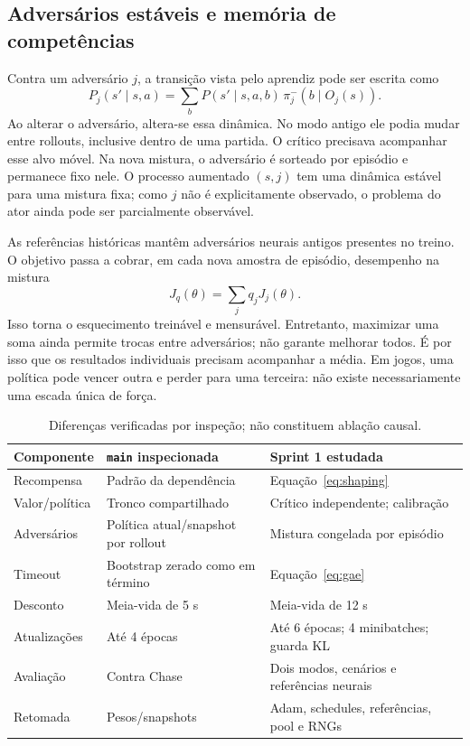 \documentclass[11pt,a4paper]{article}
\begin{document}
\subsection{Adversários estáveis e memória de competências}
Contra um adversário $j$, a transição vista pelo aprendiz pode ser escrita como
\begin{equation}
 P_j(s'\mid s,a)=\sum_b P(s'\mid s,a,b)\,\pi_j^-(b\mid O_j(s)).
\end{equation}
Ao alterar o adversário, altera-se essa dinâmica. No modo antigo ele podia mudar entre rollouts, inclusive dentro de uma partida. O crítico precisava acompanhar esse alvo móvel. Na nova mistura, o adversário é sorteado por episódio e permanece fixo nele. O processo aumentado $(s,j)$ tem uma dinâmica estável para uma mistura fixa; como $j$ não é explicitamente observado, o problema do ator ainda pode ser parcialmente observável.

As referências históricas mantêm adversários neurais antigos presentes no treino. O objetivo passa a cobrar, em cada nova amostra de episódio, desempenho na mistura
\begin{equation}
 J_q(\theta)=\sum_j q_jJ_j(\theta).
\end{equation}
Isso torna o esquecimento treinável e mensurável. Entretanto, maximizar uma soma ainda permite trocas entre adversários; não garante melhorar todos. É por isso que os resultados individuais precisam acompanhar a média. Em jogos, uma política pode vencer outra e perder para uma terceira: não existe necessariamente uma escada única de força.

\begin{table}[htbp]
\centering\small
\caption{Diferenças verificadas por inspeção; não constituem ablação causal.}
\begin{tabularx}{\textwidth}{@{}lYY@{}}\toprule
Componente & \texttt{main} inspecionada & Sprint 1 estudada\\\midrule
Recompensa & Padrão da dependência & Equação~\eqref{eq:shaping}\\
Valor/política & Tronco compartilhado & Crítico independente; calibração\\
Adversários & Política atual/snapshot por rollout & Mistura congelada por episódio\\
Timeout & Bootstrap zerado como em término & Equação~\eqref{eq:gae}\\
Desconto & Meia-vida de 5 s & Meia-vida de 12 s\\
Atualizações & Até 4 épocas & Até 6 épocas; 4 minibatches; guarda KL\\
Avaliação & Contra Chase & Dois modos, cenários e referências neurais\\
Retomada & Pesos/snapshots & Adam, schedules, referências, pool e RNGs\\\bottomrule
\end{tabularx}
\end{table}
\end{document}
